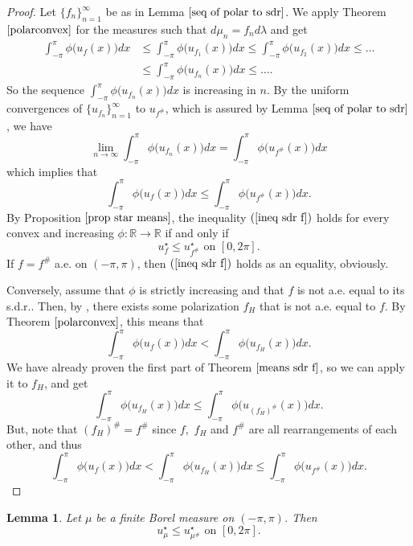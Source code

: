 \documentclass[11pt]{amsart}
\newtheorem{lemma}[theorem]{Lemma}
\numberwithin{equation}{section}
\begin{document}
\begin{proof}
Let \(\{f_n\}_{n=1}^\infty\) be as in Lemma \(\ref{seq of polar to sdr}\). We apply Theorem \(\ref{polarconvex}\) for the measures such that \(d\mu_n=f_nd\lambda\) and get
\begin{align*}
    \int_{-\pi}^\pi\phi\bigl(u_f(x)\bigr)dx&\leq \int_{-\pi}^\pi\phi\bigl(u_{f_1}(x)\bigr)dx\leq \int_{-\pi}^\pi\phi\bigl(u_{f_2}(x)\bigr)dx\leq\dots\\
    &\leq \int_{-\pi}^\pi\phi\bigl(u_{f_n}(x)\bigr)dx\leq\dots.
\end{align*}
So the sequence \(\displaystyle\int_{-\pi}^\pi\phi\bigl(u_{f_n}(x)\bigr)dx\) is increasing in \(n\). By the uniform convergences of \(\{u_{f_n}\}_{n=1}^\infty\) to \(u_{f^\#}\), which is assured by Lemma \(\ref{seq of polar to sdr}\), we have
\[\lim_{n\to\infty}\int_{-\pi}^\pi\phi\bigl(u_{f_n}(x)\bigr)dx=\int_{-\pi}^\pi\phi\bigl(u_{f^\#}(x)\bigr)dx\]
which implies that
\begin{equation}
    \int_{-\pi}^\pi\phi\bigl(u_f(x)\bigr)dx\leq\int_{-\pi}^\pi\phi\bigl(u_{f^\#}(x)\bigr)dx.
\end{equation}
By Proposition \(\ref{prop star means}\), the inequality \((\ref{ineq sdr f})\) holds for every convex and increasing \(\phi:\mathbb{R}\to\mathbb{R}\) if and only if \[u_f^\star\leq u^\star_{f^\#} \text{ on } [0,2\pi].\]
If \(f=f^\#\) a.e. on \((-\pi,\pi)\), then \((\ref{ineq sdr f})\) holds as an equality, obviously.
\par Conversely, assume that \(\phi\) is strictly increasing and that \(f\) is not a.e. equal to its s.d.r.. Then, by \cite[Lemma 1.38]{Baernstein}, there exists some polarization \(f_H\) that is not a.e. equal to \(f\). By Theorem \(\ref{polarconvex}\), this means that
\[\int_{-\pi}^\pi\phi\bigl(u_f(x)\bigr)dx<\int_{-\pi}^\pi\phi\bigl(u_{f_H}(x)\bigr)dx.\]
We have already proven the first part of Theorem \(\ref{means sdr f}\), so we can apply it to \(f_H\), and get
\[\int_{-\pi}^\pi\phi\bigl(u_{f_H}(x)\bigr)dx\leq\int_{-\pi}^\pi\phi\bigl(u_{{(f_H)}^\#}(x)\bigr)dx.\]
But, note that \((f_H)^\#=f^\#\) since \(f,\) \(f_H\) and \(f^\#\) are all rearrangements of each other, and thus
\[\int_{-\pi}^\pi\phi\bigl(u_f(x)\bigr)dx<\int_{-\pi}^\pi\phi\bigl(u_{f_H}(x)\bigr)dx\leq\int_{-\pi}^\pi\phi\bigl(u_{f^\#}(x)\bigr)dx.\]
\end{proof}
\begin{lemma}\label{lemma star mu}
Let \(\mu\) be a finite Borel measure on \((-\pi,\pi)\). Then
\begin{equation}\label{star mu}
u_{\mu}^\star\leq u_{\mu^\#}^\star \text{ on }[0,2\pi].
\end{equation}
\end{lemma}
\end{document}
